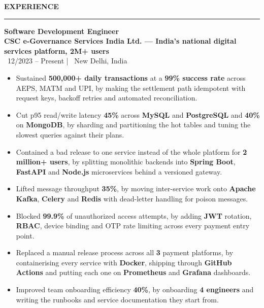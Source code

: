\documentclass[10pt]{article}
\newcommand{\resumesection}[1]{%
  \vspace{6pt}%
  {\fontfamily{phv}\selectfont\textbf{\large\MakeUppercase{#1}}}%
  \vspace{2pt}%
  \hrule%
  \vspace{4pt}%
}
\begin{document}
\resumesection{Experience}
{\textbf{Software Development Engineer}} \\
{\textbf{\textcolor{primaryblue}{CSC e-Governance Services India Ltd. --- India's national digital services platform, 2M+ users}}} \\
{\footnotesize\textcolor{primaryblue}{\faCalendar*}~12/2023 -- Present \quad | \quad \textcolor{primaryblue}{\faMapMarker*}~New Delhi, India}
\begin{itemize}
    \item Sustained \textbf{500,000+ daily transactions} at a \textbf{99\% success rate} across AEPS, MATM and UPI, by making the settlement path idempotent with request keys, backoff retries and automated reconciliation.
    \item Cut p95 read/write latency \textbf{45\%} across \textbf{MySQL} and \textbf{PostgreSQL} and \textbf{40\%} on \textbf{MongoDB}, by sharding and partitioning the hot tables and tuning the slowest queries against their plans.
    \item Contained a bad release to one service instead of the whole platform for \textbf{2 million+ users}, by splitting monolithic backends into \textbf{Spring Boot}, \textbf{FastAPI} and \textbf{Node.js} microservices behind a versioned gateway.
    \item Lifted message throughput \textbf{35\%}, by moving inter-service work onto \textbf{Apache Kafka}, \textbf{Celery} and \textbf{Redis} with dead-letter handling for poison messages.
    \item Blocked \textbf{99.9\%} of unauthorized access attempts, by adding \textbf{JWT} rotation, \textbf{RBAC}, device binding and OTP rate limiting across every payment entry point.
    \item Replaced a manual release process across all \textbf{3} payment platforms, by containerising every service with \textbf{Docker}, shipping through \textbf{GitHub Actions} and putting each one on \textbf{Prometheus} and \textbf{Grafana} dashboards.
    \item Improved team onboarding efficiency \textbf{40\%}, by onboarding \textbf{4 engineers} and writing the runbooks and service documentation they start from.
\end{itemize}
\end{document}
